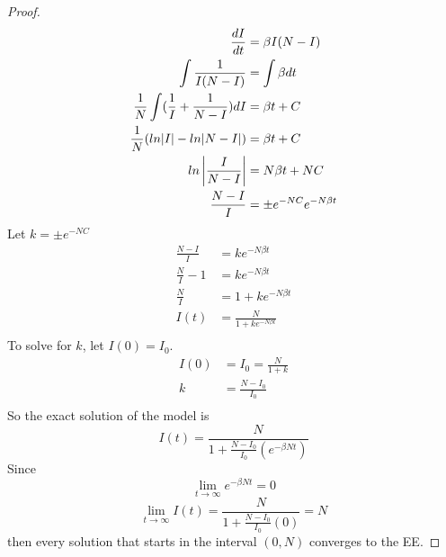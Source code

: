  \begin{proof}
    \begin{align*}
        \frac{dI}{dt}                                   &= \beta I(N-I)\\
        \int\frac{1}{I(N-I)}                            &= \int\beta dt\\
        \frac{1}{N}\int (\frac{1}{I} + \frac{1}{N-I})dI &= \beta t + C\\
        \frac{1}{N}(ln|I|- ln|N-I|)                     &= \beta t + C\\
        ln\left|\frac{I}{N-I}\right|                           &= N \beta t + NC\\
        \frac{N-I}{I}                                   &= \pm e^{-NC}e^{-N\beta t}\\
    \end{align*}
    Let $k = \pm e^{-NC}$\\
    \begin{align*}
        \frac{N-I}{I} 	  &= ke^{-N\beta t}\\
        \frac{N}{I} - 1   &= ke^{-N\beta t}\\
        \frac{N}{I} 	  &= 1 + ke^{-N\beta t}\\
        I(t) 			   &= \frac{N}{1 + ke^{-N\beta t}}\\
    \end{align*}
    To solve for $k$, let $I(0) = I_0$.\\
    \begin{align*}
        I(0) 	&= I_0 = \frac{N}{1 + k}\\
        k 		&= \frac{N - I_0}{I_0}\\
    \end{align*}
    So the exact solution of the model is
    \begin{equation}
        I(t) =  \frac{N}{1+\frac{N-I_0}{I_0}(e^{-\beta N t})}
    \end{equation}
    Since
    $$\lim_{t\to\infty} e^{-\beta N t} = 0$$
    $$\lim_{t\to\infty} I(t) = \frac{N}{1 +\frac{N-I_0}{I_0}(0)} = N$$
    then every solution that starts in the interval $(0, N)$ converges to the EE.
\end{proof}
